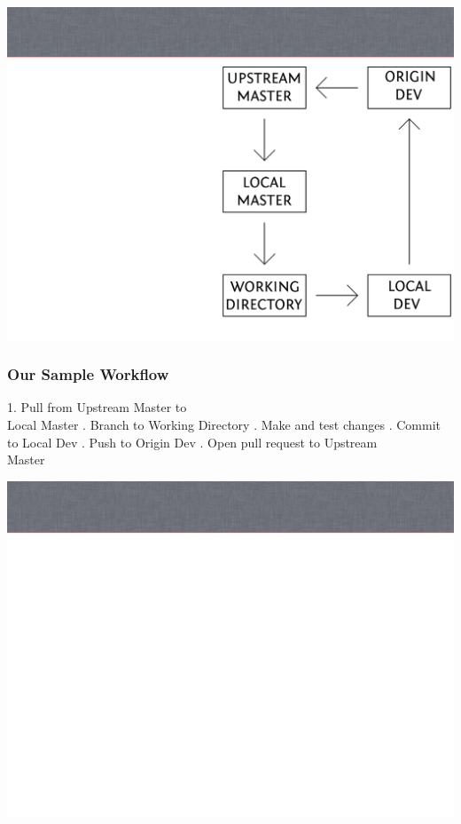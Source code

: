 \documentclass[unknownkeysallowed]{beamer}
\begin{document}
{\includegraphics[width=\paperwidth,height=\paperheight]{assets/workflow_bg}}
\begin{frame}
    \vspace{1cm} %
    \frametitle{Our Sample Workflow}
        1. Pull from Upstream Master to \\
        Local Master \linebreak{}. Branch to Working Directory \linebreak{}. Make and test changes \linebreak{}. Commit to Local Dev \linebreak{}. Push to Origin Dev \linebreak{}. Open pull request to Upstream \\
        Master
    \vspace{1cm} %
\end{frame}
{\includegraphics[width=\paperwidth,height=\paperheight]{assets/slide_bg}}
\end{document}
